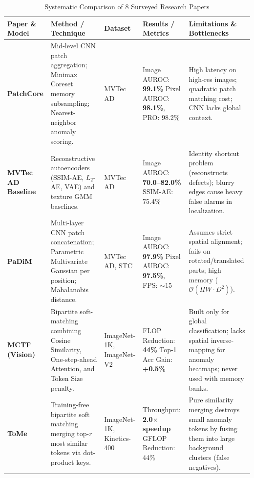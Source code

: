 \documentclass[10pt,journal,compsoc]{IEEEtran}
\begin{document}
\begin{table}[t]
\centering
\caption{Systematic Comparison of 8 Surveyed Research Papers}
\label{tab:comparison}
\scriptsize
\begin{tabularx}{\textwidth}{l p{4.2cm} p{1.6cm} p{2.8cm} X}
\toprule
\textbf{Paper \& Model} & \textbf{Method / Technique} & \textbf{Dataset} & \textbf{Results / Metrics} & \textbf{Limitations \& Bottlenecks} \\
\midrule
\textbf{PatchCore} \cite{roth2022patchcore} & Mid-level CNN patch aggregation; Minimax Coreset memory subsampling; Nearest-neighbor anomaly scoring. & MVTec AD & Image AUROC: \textbf{99.1\%} \newline Pixel AUROC: \textbf{98.1\%}, PRO: 98.2\% & High latency on high-res images; quadratic patch matching cost; CNN lacks global context. \\
\midrule
\textbf{MVTec AD Baseline} \cite{bergmann2019mvtec} & Reconstructive autoencoders (SSIM-AE, $L_2$-AE, VAE) and texture GMM baselines. & MVTec AD & Image AUROC: \textbf{70.0--82.0\%} \newline SSIM-AE: 75.4\% & Identity shortcut problem (reconstructs defects); blurry edges cause heavy false alarms in localization. \\
\midrule
\textbf{PaDiM} \cite{defard2020padim} & Multi-layer CNN patch concatenation; Parametric Multivariate Gaussian per position; Mahalanobis distance. & MVTec AD, STC & Image AUROC: \textbf{97.9\%} \newline Pixel AUROC: \textbf{97.5\%}, FPS: $\sim$15 & Assumes strict spatial alignment; fails on rotated/translated parts; high memory ($\mathcal{O}(HW \cdot D^2)$). \\
\midrule
\textbf{MCTF (Vision)} \cite{lee2024multi} & Bipartite soft-matching combining Cosine Similarity, One-step-ahead Attention, and Token Size penalty. & ImageNet-1K, ImageNet-V2 & FLOP Reduction: \textbf{44\%} \newline Top-1 Acc Gain: \textbf{+0.5\%} & Built only for global classification; lacks spatial inverse-mapping for anomaly heatmaps; never used with memory banks. \\
\midrule
\textbf{ToMe} \cite{bolya2023tome} & Training-free bipartite soft matching merging top-$r$ most similar tokens via dot-product keys. & ImageNet-1K, Kinetics-400 & Throughput: \textbf{2.0$\times$ speedup} \newline GFLOP Reduction: 44\% & Pure similarity merging destroys small anomaly tokens by fusing them into large background clusters (false negatives). \\

\end{tabularx}
\end{table}
\end{document}
